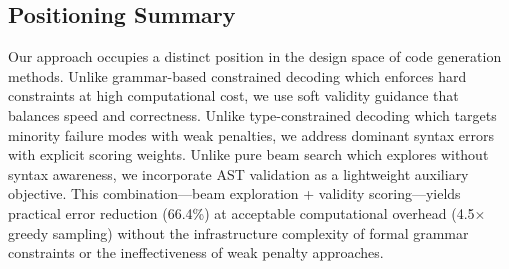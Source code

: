 \subsection{Positioning Summary}

Our approach occupies a distinct position in the design space of code generation methods. Unlike grammar-based constrained decoding which enforces hard constraints at high computational cost, we use soft validity guidance that balances speed and correctness. Unlike type-constrained decoding which targets minority failure modes with weak penalties, we address dominant syntax errors with explicit scoring weights. Unlike pure beam search which explores without syntax awareness, we incorporate AST validation as a lightweight auxiliary objective. This combination---beam exploration + validity scoring---yields practical error reduction (66.4\%) at acceptable computational overhead (4.5$\times$ greedy sampling) without the infrastructure complexity of formal grammar constraints or the ineffectiveness of weak penalty approaches.
